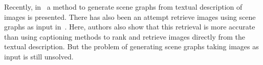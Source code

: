 Recently, in~\cite{schuster2015generating} a method to generate scene graphs
from textual description of images is presented.
There has also been an attempt retrieve images using scene graphs as input
in~\cite{johnson2015image}.
Here, authors also show that this retrieval is more accurate than using
captioning methods to rank and retrieve images directly from the textual
description.
But the problem of generating scene graphs taking images as input is still
unsolved.
